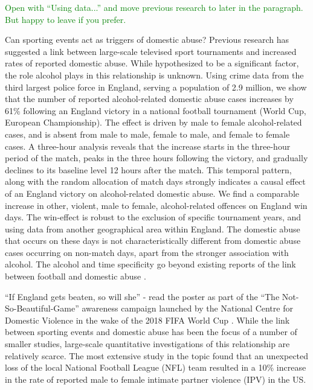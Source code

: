 \documentclass[12pt, letterpaper]{article}
\newcommand{\NS}[1] {{\textcolor{green}{#1}}}
\begin{document}
\NS{Open with ``Using data...'' and move previous research to later in the paragraph. But happy to leave if you prefer.}

Can sporting events act as triggers of domestic abuse? Previous research has suggested a link between large-scale televised sport tournaments and increased rates of reported domestic abuse\autocite{Card2011,Kirby2014}. While hypothesized to be a significant factor, the role alcohol plays in this relationship is unknown. Using crime data from the third largest police force in England, serving a population of 2.9 million\autocite{populationfigure}, we show that the number of reported alcohol-related domestic abuse cases increases by 61\% following an England victory in a national football tournament (World Cup, European Championship). The effect is driven by male to female alcohol-related cases, and is absent from male to male, female to male, and female to female cases. A three-hour analysis reveals that the increase starts in the three-hour period of the match, peaks in the three hours following the victory, and gradually declines to its baseline level 12 hours after the match. This temporal pattern, along with the random allocation of match days strongly indicates a causal effect of an England victory on alcohol-related domestic abuse. We find a comparable increase in other, violent, male to female, alcohol-related offences on England win days.  The win-effect is robust to the exclusion of specific tournament years, and using data from another geographical area within England. The domestic abuse that occurs on these days is not characteristically different from domestic abuse cases occurring on non-match days, apart from the stronger association with alcohol. The alcohol and time specificity go beyond existing reports of the link between football and domestic abuse \autocite{Kirby2014,Brimicombe2012}. 



``If England gets beaten, so will she'' - read the poster as part of the ``The Not-So-Beautiful-Game'' awareness campaign launched by the National Centre for Domestic Violence in the wake of the 2018 FIFA World Cup \autocite{NCDV}. While the link between sporting events and domestic abuse has been the focus of a number of smaller studies\autocite{Williams2014}, large-scale quantitative investigations of this relationship are relatively scarce. The most extensive study in the topic found that an unexpected loss of the local National Football League (NFL) team resulted in a 10\% increase in the rate of reported male to female intimate partner violence (IPV) in the US\autocite{Card2011}. 
\end{document}
